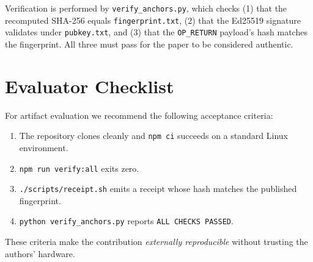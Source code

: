 Verification is performed by \texttt{verify\_anchors.py}, which checks
(1) that the recomputed SHA-256 equals \texttt{fingerprint.txt}, (2) that
the Ed25519 signature validates under \texttt{pubkey.txt}, and (3) that the
\texttt{OP\_RETURN} payload's hash matches the fingerprint. All three must
pass for the paper to be considered authentic.

\section{Evaluator Checklist}
\label{sec:artifact-checklist}

For artifact evaluation we recommend the following acceptance criteria:

\begin{enumerate}
  \item The repository clones cleanly and \texttt{npm ci} succeeds on a
        standard Linux environment.
  \item \texttt{npm run verify:all} exits zero.
  \item \texttt{./scripts/receipt.sh} emits a receipt whose hash matches
        the published fingerprint.
  \item \texttt{python verify\_anchors.py} reports \texttt{ALL CHECKS
        PASSED}.
\end{enumerate}

These criteria make the contribution \emph{externally reproducible} without
trusting the authors' hardware.
